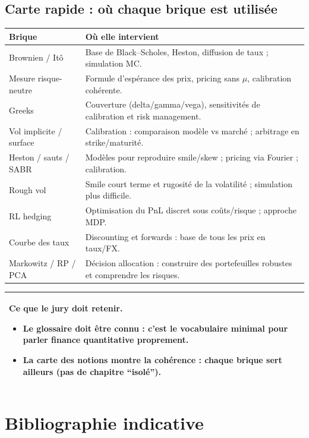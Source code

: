 \documentclass[11pt,a4paper]{report}
\newcommand{\1}{\mathbbm{1}}
\theoremstyle{definition}
\theoremstyle{plain}
\theoremstyle{remark}
\newenvironment{jurybox}{%
  \begin{center}
  \setlength{\tabcolsep}{6pt}%
  \renewcommand{\arraystretch}{1.1}%
  \begin{tabular}{|p{0.94\textwidth}|}
  \hline
  \small\textbf{Ce que le jury doit retenir.}\par\medskip
}{%
  \\ \hline
  \end{tabular}
  \end{center}
}
\begin{document}
\section{Carte rapide : où chaque brique est utilisée}
\begin{longtable}{@{}p{4.2cm}p{9.8cm}@{}}
\toprule
Brique & Où elle intervient \\
\midrule
Brownien / Itô & Base de Black--Scholes, Heston, diffusion de taux ; simulation MC. \\
Mesure risque-neutre & Formule d'espérance des prix, pricing sans $\mu$, calibration cohérente. \\
Greeks & Couverture (delta/gamma/vega), sensitivités de calibration et risk management. \\
Vol implicite / surface & Calibration : comparaison modèle vs marché ; arbitrage en strike/maturité. \\
Heston / sauts / SABR & Modèles pour reproduire smile/skew ; pricing via Fourier ; calibration. \\
Rough vol & Smile court terme et rugosité de la volatilité ; simulation plus difficile. \\
RL hedging & Optimisation du PnL discret sous coûts/risque ; approche MDP. \\
Courbe des taux & Discounting et forwards : base de tous les prix en taux/FX. \\
Markowitz / RP / PCA & Décision allocation : construire des portefeuilles robustes et comprendre les risques. \\
\bottomrule
\end{longtable}

\begin{jurybox}
\begin{itemize}
\item Le glossaire doit être connu : c'est le vocabulaire minimal pour parler finance quantitative proprement.
\item La carte des notions montre la cohérence : chaque brique sert ailleurs (pas de chapitre ``isolé'').
\end{itemize}
\end{jurybox}

\chapter*{Bibliographie indicative}
\end{document}

